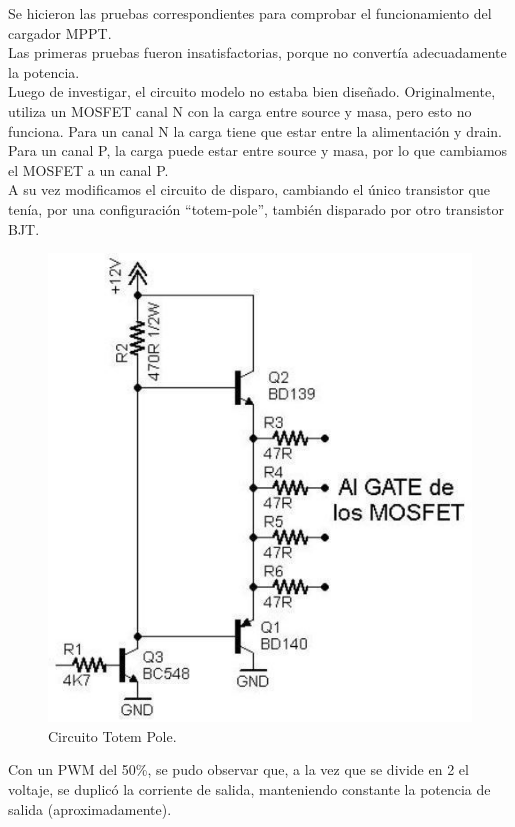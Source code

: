Se hicieron las pruebas correspondientes para comprobar el funcionamiento del cargador MPPT.\\

Las primeras pruebas fueron insatisfactorias, porque no convertía adecuadamente la potencia.\\

Luego de investigar, el circuito modelo no estaba bien diseñado. Originalmente, utiliza un MOSFET canal N con la carga entre source y masa, pero esto no funciona. Para un canal N la carga tiene que estar entre la alimentación y drain.\\

Para un canal P, la carga puede estar entre source y masa, por lo que cambiamos el MOSFET a un canal P.\\

A su vez modificamos el circuito de disparo, cambiando el único transistor que tenía, por una configuración “totem-pole”, también disparado por otro transistor BJT.\\

\begin{figure}[H]
    \centering
    \includegraphics[width=0.5\linewidth]{informes/Imagen de WhatsApp 2023-10-11 a las 20.57.02_7faa2d47.jpg}
    \caption{Circuito Totem Pole.}
    
\end{figure}

Con un PWM del 50\%, se pudo observar que, a la vez que se divide en 2 el voltaje, se duplicó la corriente de salida, manteniendo constante la potencia de salida (aproximadamente).\\

